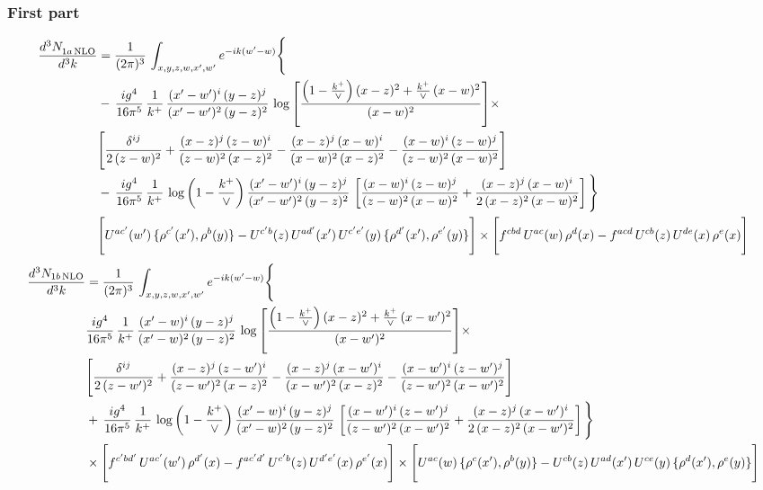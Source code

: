 \documentclass[9pt]{article}
\numberwithin{equation}{section}
\begin{document}
\subsubsection{First part}
\begin{align}
 \frac{d^{3}N_{1a\,\rm NLO}^{\rm}}{d^{3}k}  & =     \frac{1}{(2\pi)^{3}}\,\int_{x,y,z,w,x',w^{\prime}} e^{-ik(w^{\prime}-w)}\Bigg\{\notag \\
& -\, \frac{ig^{4}}{16\pi^{5}}\,\frac{1}{k^{+}}\, \frac{(x'-w')^{i}\,(y-z)^{j}}{(x'-w')^{2}\,(y-z)^{2}}\,\log{\left[\frac{\left(1-\frac{k^{+}}{\vee}\right)(x-z)^{2}+\frac{k^{+}}{\vee}\,(x-w)^{2}}{(x-w)^{2}}\right]}\times\notag \\ &  \Bigg[\frac{\delta^{ij}}{2\,(z-w)^{2}}+\frac{(x-z)^{j}\,(z-w)^{i}}{(z-w)^{2}\,(x-z)^{2}}-\frac{(x-z)^{j}\,(x-w)^{i}}{(x-w)^{2}\,(x-z)^{2}}-\frac{(x-w)^{i}\,(z-w)^{j}}{(z-w)^{2}\,(x-w)^{2}}\Bigg] \notag \\
& -\, \frac{ig^{4}}{16\pi^{5}}\,\frac{1}{k^{+}}\,\log{\left(1-\frac{k^{+}}{\vee}\right)}\,\frac{(x'-w')^{i}\,(y-z)^{j}}{(x'-w')^{2}\,(y-z)^{2}}\,\left[\frac{(x-w)^{i}\,(z-w)^{j}}{(z-w)^{2}\,(x-w)^{2}}+\frac{(x-z)^{j}\,(x-w)^{i}}{2\,(x-z)^{2}\, (x-w)^{2}}\right]\Bigg\} \notag \\ & \Bigg[U^{ac'}(w')\,\{\rho^{c'}(x'),\rho^{b}(y)\}-U^{c'b}(z)\,U^{ad'}(x')\,U^{c'e'}(y)\, \{\rho^{d'}(x'),\rho^{e'}(y)\}\Bigg]\times \Bigg[f^{cbd}\,U^{ac}(w)\,\rho^{d}(x)-f^{acd}\, U^{cb}(z)\,U^{de}(x)\,\rho^{e}(x)\Bigg]
\end{align}
\begin{align}
\frac{d^{3}N_{1b\, \rm NLO}}{d^{3}k} & =  \frac{1}{(2\pi)^{3}}\,\int_{x,y,z,w,x',w^{\prime}} e^{-ik(w^{\prime}-w)}\Bigg\{\notag \\
&  \frac{ig^{4}}{16\pi^{5}}\,\frac{1}{k^{+}}\, \frac{(x'-w)^{i}\,(y-z)^{j}}{(x'-w)^{2}\,(y-z)^{2}}\,\log{\left[\frac{\left(1-\frac{k^{+}}{\vee}\right)(x-z)^{2}+\frac{k^{+}}{\vee}\,(x-w')^{2}}{(x-w')^{2}}\right]}\times\notag \\ &  \Bigg[\frac{\delta^{ij}}{2\,(z-w')^{2}}+\frac{(x-z)^{j}\,(z-w')^{i}}{(z-w')^{2}\,(x-z)^{2}}-\frac{(x-z)^{j}\,(x-w')^{i}}{(x-w')^{2}\,(x-z)^{2}}-\frac{(x-w')^{i}\,(z-w')^{j}}{(z-w')^{2}\,(x-w')^{2}}\Bigg] \notag \\
& +\,\frac{ig^{4}}{16\pi^{5}}\,\frac{1}{k^{+}}\,\log{\left(1-\frac{k^{+}}{\vee}\right)}\,\frac{(x'-w)^{i}\,(y-z)^{j}}{(x'-w)^{2}\,(y-z)^{2}}\,\left[\frac{(x-w')^{i}\,(z-w')^{j}}{(z-w')^{2}\,(x-w')^{2}}+\frac{(x-z)^{j}\,(x-w')^{i}}{2\,(x-z)^{2}\, (x-w')^{2}}\right]\Bigg\} \notag \\ & \times\Bigg[f^{c'bd'}\,U^{ac'}(w')\,\rho^{d'}(x)-f^{ac'd'}\, U^{c'b}(z)\,U^{d'e'}(x)\,\rho^{e'}(x)\Bigg] \times \Bigg[U^{ac}(w)\,\{\rho^{c}(x'),\rho^{b}(y)\}-U^{cb}(z)\,U^{ad}(x')\,U^{ce}(y)\, \{\rho^{d}(x'),\rho^{e}(y)\}\Bigg]
\end{align}
\end{document}
